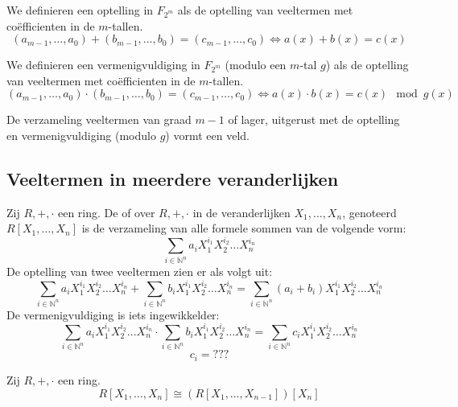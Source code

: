 \documentclass[main.tex]{subfiles}
\begin{document}
\begin{de}
  We definieren een optelling in $F_{2^{m}}$ als de optelling van veeltermen met co\"efficienten in de $m$-tallen.
  \[ (a_{m-1},\dotsc,a_{0}) + (b_{m-1},\dotsc,b_{0}) =  (c_{m-1},\dotsc,c_{0}) \Leftrightarrow a(x) + b(x) = c(x) \]
\end{de}

\begin{de}
  We definieren een vermenigvuldiging in $F_{2^{m}}$ (modulo een $m$-tal $g$) als de optelling van veeltermen met co\"efficienten in de $m$-tallen.
  \[ (a_{m-1},\dotsc,a_{0}) \cdot (b_{m-1},\dotsc,b_{0}) =  (c_{m-1},\dotsc,c_{0}) \Leftrightarrow a(x) \cdot b(x) = c(x) \mod g(x) \]
\end{de}

\begin{ei}
  De verzameling veeltermen van graad $m-1$ of lager, uitgerust met de optelling en vermenigvuldiging (modulo $g$) vormt een veld.
\end{ei}

\subsection{Veeltermen in meerdere veranderlijken}
\label{sec:veelt-meerd-verand}

\begin{de}
  Zij $R,+,\cdot$ een ring.
  De  of  over $R,+,\cdot$ in de veranderlijken $X_{1},\dotsc,X_{n}$, genoteerd $R[X_{1},\dotsc,X_{n}]$ is de verzameling van alle formele sommen van de volgende vorm:
  \[ \sum_{i\in \mathbb{N}^{n}}a_{i}X_{1}^{i_{1}}X_{2}^{i_{2}}\dotsc X_{n}^{i_{n}}\]
  De optelling van twee veeltermen zien er als volgt uit:
  \[
  \sum_{i\in \mathbb{N}^{n}}a_{i}X_{1}^{i_{1}}X_{2}^{i_{2}}\dotsc X_{n}^{i_{n}} + \sum_{i\in \mathbb{N}^{n}}b_{i}X_{1}^{i_{1}}X_{2}^{i_{2}}\dotsc X_{n}^{i_{n}}
  = \sum_{i\in \mathbb{N}^{n}}(a_{i}+b_{i})X_{1}^{i_{1}}X_{2}^{i_{2}}\dotsc X_{n}^{i_{n}}
  \]
  De vermenigvuldiging is iets ingewikkelder:
  \[
  \sum_{i\in \mathbb{N}^{n}}a_{i}X_{1}^{i_{1}}X_{2}^{i_{2}}\dotsc X_{n}^{i_{n}} \cdot\sum_{i\in \mathbb{N}^{n}}b_{i}X_{1}^{i_{1}}X_{2}^{i_{2}}\dotsc X_{n}^{i_{n}}
  = \sum_{i\in \mathbb{N}^{n}}c_{i}X_{1}^{i_{1}}X_{2}^{i_{2}}\dotsc X_{n}^{i_{n}}
  \]
  \[ c_{i} = ??? \]
\end{de}

\begin{ei}
  Zij $R,+,\cdot$ een ring.
  \[ R[X_{1},\dotsc,X_{n}] \cong (R[X_{1},\dotsc,X_{n-1}])[X_{n}] \]
\end{ei}
\end{document}

